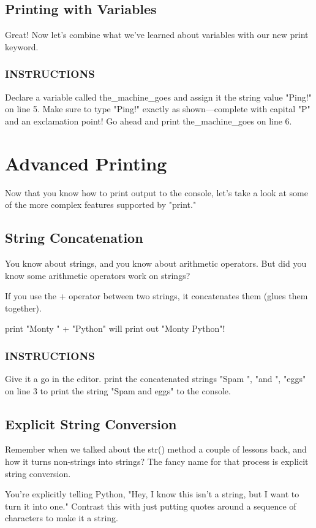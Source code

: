 \documentclass[12pt,a4paper,final,twoside,onecolumn,titlepage]{book}
\begin{document}
\subsection{Printing with Variables}
Great! Now let's combine what we've learned about variables with our new print keyword.

\subsubsection{INSTRUCTIONS}
Declare a variable called the\_machine\_goes and assign it the string value "Ping!" on line 5. Make sure to type "Ping!" exactly as shown—complete with capital "P" and an exclamation point!
Go ahead and print the\_machine\_goes on line 6.

\section{Advanced Printing}
Now that you know how to print output to the console, let's take a look at some of the more complex features supported by "print."

\subsection{String Concatenation}
You know about strings, and you know about arithmetic operators. But did you know some arithmetic operators work on strings?

If you use the + operator between two strings, it concatenates them (glues them together).

print "Monty " + "Python"
will print out "Monty Python"!

\subsubsection{INSTRUCTIONS}
Give it a go in the editor. print the concatenated strings "Spam ", "and ", "eggs" on line 3 to print the string "Spam and eggs" to the console.

\subsection{Explicit String Conversion}
Remember when we talked about the str() method a couple of lessons back, and how it turns non-strings into strings? The fancy name for that process is explicit string conversion.

You're explicitly telling Python, "Hey, I know this isn't a string, but I want to turn it into one." Contrast this with just putting quotes around a sequence of characters to make it a string.
\end{document}
